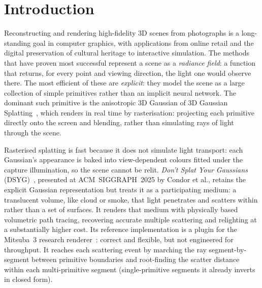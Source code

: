 \chapter{Introduction}

Reconstructing and rendering high-fidelity 3D scenes from photographs is a long-standing goal in
computer graphics, with applications from online retail and the digital preservation of cultural
heritage to interactive simulation. The methods that have proven most successful represent a scene as a \emph{radiance field}:
a function that returns, for every point and viewing direction, the light one would
observe there. The most efficient of these are \emph{explicit}: they model the scene as a
large collection of simple primitives rather than an implicit neural network. The dominant such
primitive is the anisotropic 3D Gaussian of 3D Gaussian Splatting~\cite{3DGS}, which renders in real
time by rasterisation: projecting each primitive directly onto the screen and blending,
rather than simulating rays of light through the scene.

Rasterised splatting is fast because it does not simulate light transport: each Gaussian's
appearance is baked into view-dependent colours fitted under the capture illumination, so
the scene cannot be relit. \emph{Don't Splat Your
Gaussians} (DSYG)~\cite{DSYG}, presented at ACM~SIGGRAPH~2025 by Condor et al., retains the explicit Gaussian representation but treats it as a participating medium: a
translucent volume, like cloud or smoke, that light penetrates and scatters within rather
than a set of surfaces. It renders that medium with
physically based volumetric path tracing, recovering accurate multiple scattering and relighting at a
substantially higher cost. Its reference implementation is a plugin for the Mitsuba~3 research
renderer~\cite{Mitsuba3}: correct and flexible, but not engineered for throughput. It reaches each
scattering event by marching the ray segment-by-segment between primitive boundaries and root-finding
the scatter distance within each multi-primitive segment (single-primitive segments it already inverts
in closed form).


